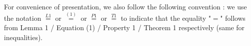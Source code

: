 For convenience of presentation, we also follow the following convention : we use the notation $\stackrel{L1}{=}$ or $\stackrel{(1)}{=}$ or $\stackrel{P1}{=}$ or $\stackrel{T1}{=}$ to indicate that the equality "$=$" follows from Lemma 1 / Equation (1) / Property 1 / Theorem 1 respectively (same for inequalities).